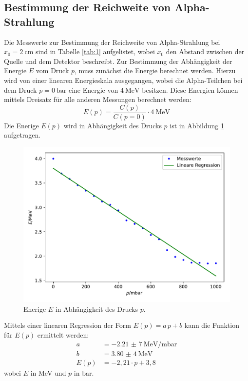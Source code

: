 \subsection{Bestimmung der Reichweite von Alpha-Strahlung}
Die Messwerte zur Bestimmung der Reichweite von Alpha-Strahlung bei $x_0=\SI{2}{\centi\meter}$ sind in Tabelle \ref{tab:1} aufgelistet, wobei $x_0$
den Abstand zwischen der Quelle und dem Detektor beschreibt.
Zur Bestimmung der Abhängigkeit der Energie $E$ vom Druck $p$, muss zunächst die Energie berechnet werden. Hierzu wird von einer linearen
Energieskala ausgegangen, wobei die Alpha-Teilchen bei dem Druck $p=\SI{0}{\bar}$ eine Energie von $\SI{4}{\mega\eV}$ besitzen. Diese Energien können
mittels Dreisatz für alle anderen Messungen berechnet werden:
\begin{equation*}
  E(p)= \frac{C(p)}{C(p=0)} \cdot \SI{4}{\mega\eV}
\end{equation*}
Die Enerige $E(p)$  wird in Abhängigkeit des Drucks $p$ ist in Abbildung \ref{abb:1} aufgetragen.
\begin{figure}
  \centering
  \includegraphics[scale=0.6]{Messung1b.pdf}
  \caption{Enerige $E$ in Abhängigkeit des Drucks $p$.}
  \label{abb:1}
\end{figure}
Mittels einer linearen Regression der Form $E(p)=a\,p+b$ kann die Funktion für $E(p)$ ermittelt werden:
\begin{align*}
  a&= \SI{-2,21(7)}{\mega\eV\per\milli\bar} \\
  b&= \SI{3,80(4)}{\mega\eV}\\
  E(p)&= -2,21 \cdot p +3,8
\end{align*}
wobei $E$ in \si{\mega\eV} und $p$ in \si{bar}.


